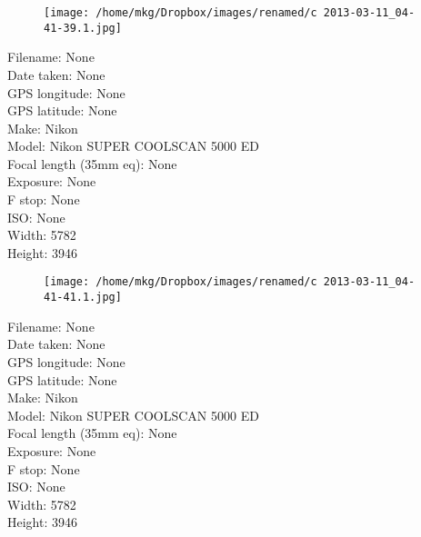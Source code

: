 \clearpage
\recalctypearea
\newpage
\noindent
\begin{figure}
    \texttt{[image: /home/mkg/Dropbox/images/renamed/c 2013-03-11\_04-41-39.1.jpg]}
\end{figure}

\clearpage
\recalctypearea
\newpage
\noindent
Filename: None\\ 
Date taken: None\\ 
GPS longitude: None\\ 
GPS latitude: None\\ 
Make: Nikon\\ 
Model: Nikon SUPER COOLSCAN 5000 ED\\ 
Focal length (35mm eq): None\\ 
Exposure: None\\ 
F stop: None\\ 
ISO: None\\ 
Width: 5782\\ 
Height: 3946\\ 

\clearpage
\recalctypearea
\newpage
\noindent
\begin{figure}
    \texttt{[image: /home/mkg/Dropbox/images/renamed/c 2013-03-11\_04-41-41.1.jpg]}
\end{figure}

\clearpage
\recalctypearea
\newpage
\noindent
Filename: None\\ 
Date taken: None\\ 
GPS longitude: None\\ 
GPS latitude: None\\ 
Make: Nikon\\ 
Model: Nikon SUPER COOLSCAN 5000 ED\\ 
Focal length (35mm eq): None\\ 
Exposure: None\\ 
F stop: None\\ 
ISO: None\\ 
Width: 5782\\ 
Height: 3946\\ 

